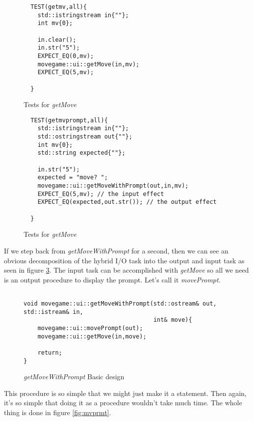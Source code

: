 \documentclass[nobib]{tufte-handout}
\begin{document}
\begin{figure}[!htbp]
\begin{lstlisting}
  TEST(getmv,all){
    std::istringstream in{""};
    int mv{0};

    in.clear();
    in.str("5");
    EXPECT_EQ(0,mv);    
    movegame::ui::getMove(in,mv);
    EXPECT_EQ(5,mv);

  }
\end{lstlisting}
\caption{Tests for \textit{getMove}}
\label{fig:get-tests}
\end{figure}

\begin{figure}[!htbp]
\begin{lstlisting}
  TEST(getmvprompt,all){
    std::istringstream in{""};
    std::ostringstream out{""};
    int mv{0};
    std::string expected{""};

    in.str("5");
    expected = "move? ";
    movegame::ui::getMoveWithPrompt(out,in,mv);
    EXPECT_EQ(5,mv); // the input effect
    EXPECT_EQ(expected,out.str()); // the output effect
    
  }
\end{lstlisting}
\caption{Tests for \textit{getMove}}
\label{fig:getPrmt-tests}
\end{figure}

If we step back from \textit{getMoveWithPrompt} for a second, then we can see an obvious decomposition of the hybrid I/O task into the output and input task as seen in figure \ref{fig:getPrmt-basic}.  The input task can be accomplished with \textit{getMove} so all we need is an output procedure to display the prompt.  Let's call it \textit{movePrompt}. 

\begin{figure}[!htbp]
\begin{lstlisting}

void movegame::ui::getMoveWithPrompt(std::ostream& out, std::istream& in,
								     int& move){
	movegame::ui::movePrompt(out);
	movegame::ui::getMove(in,move);

	return;
}
\end{lstlisting}
\caption{\textit{getMoveWithPrompt} Basic design}
\label{fig:getPrmt-basic}
\end{figure}


This procedure is so simple that we might just make it a statement. Then again, it's so simple that doing it as a procedure wouldn't take much time. The whole thing is done in figure \ref{fig:mvprmt}. 
\end{document}
